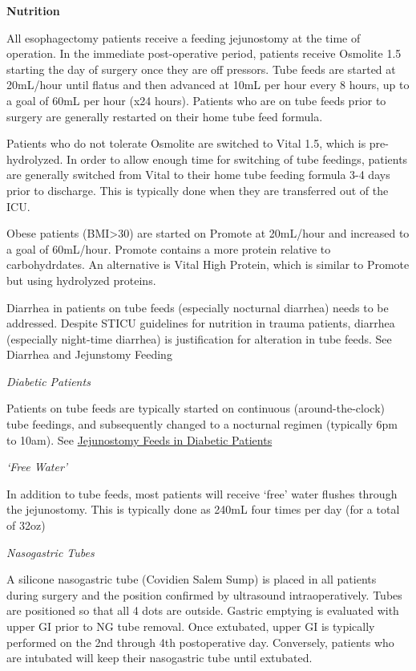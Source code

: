 \documentclass[
]{book}
\begin{document}
\textbf{Nutrition}

All esophagectomy patients receive a feeding jejunostomy at the time of operation. In the immediate post-operative period, patients receive Osmolite 1.5 starting the day of surgery once they are off pressors. Tube feeds are started at 20mL/hour until flatus and then advanced at 10mL per hour every 8 hours, up to a goal of 60mL per hour (x24 hours). Patients who are on tube feeds prior to surgery are generally restarted on their home tube feed formula.

Patients who do not tolerate Osmolite are switched to Vital 1.5, which is pre-hydrolyzed. In order to allow enough time for switching of tube feedings, patients are generally switched from Vital to their home tube feeding formula 3-4 days prior to discharge. This is typically done when they are transferred out of the ICU.

Obese patients (BMI\textgreater30) are started on Promote at 20mL/hour and increased to a goal of 60mL/hour. Promote contains a more protein relative to carbohydrdates. An alternative is Vital High Protein, which is similar to Promote but using hydrolyzed proteins.

Diarrhea in patients on tube feeds (especially nocturnal diarrhea) needs to be addressed. Despite STICU guidelines for nutrition in trauma patients, diarrhea (especially night-time diarrhea) is justification for alteration in tube feeds. See Diarrhea and Jejunstomy Feeding

\emph{Diabetic Patients}

Patients on tube feeds are typically started on continuous (around-the-clock) tube feedings, and subsequently changed to a nocturnal regimen (typically 6pm to 10am). See \protect\hyperlink{jejunostomy_diabetes}{Jejunostomy Feeds in Diabetic Patients}

\emph{`Free Water'}

In addition to tube feeds, most patients will receive `free' water flushes through the jejunostomy. This is typically done as 240mL four times per day (for a total of 32oz)

\emph{Nasogastric Tubes}

A silicone nasogastric tube (Covidien Salem Sump) is placed in all patients during surgery and the position confirmed by ultrasound intraoperatively. Tubes are positioned so that all 4 dots are outside. Gastric emptying is evaluated with upper GI prior to NG tube removal. Once extubated, upper GI is typically performed on the 2nd through 4th postoperative day. Conversely, patients who are intubated will keep their nasogastric tube until extubated.
\end{document}
